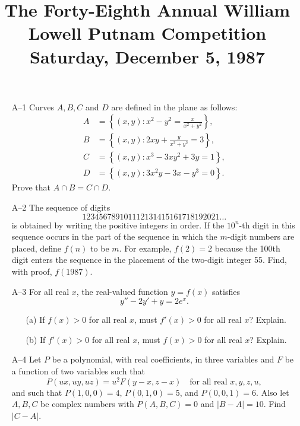 \documentclass[amssymb,twocolumn,pra,10pt,aps]{revtex4-1}
\begin{document}
\title{The Forty-Eighth Annual William Lowell Putnam Competition \\
    Saturday, December 5, 1987 \vspace{-2\baselineskip}}
\maketitle

\begin{itemize}
\item[A--1]
Curves $A,B,C$ and $D$ are defined in the plane as follows:
\begin{align*}
A &= \left\{ (x,y): x^2-y^2 = \frac{x}{x^2+y^2} \right\}, \\
B &= \left\{ (x,y): 2xy + \frac{y}{x^2+y^2} = 3 \right\}, \\
C &= \left\{ (x,y): x^3-3xy^2+3y=1 \right\}, \\
D &= \left\{ (x,y): 3x^2 y - 3x - y^3 = 0\right\}.
\end{align*}
Prove that $A \cap B = C \cap D$.

\item[A--2]
The sequence of digits
\[
1 2 3 4 5 6 7 8 9 1 0 1 1 1 2 1 3 1 4 1 5 1 6 1 7 1 8 1 9 2 0 2 1 \dots
\]
is obtained by writing the positive integers in order. If the
$10^n$-th digit in this sequence occurs in the part of the sequence in
which the $m$-digit numbers are placed, define $f(n)$ to be $m$. For
example, $f(2)=2$ because the 100th digit enters the sequence in the
placement of the two-digit integer 55. Find, with proof, $f(1987)$.

\item[A--3]
For all real $x$, the real-valued function $y=f(x)$ satisfies
\[
y''-2y'+y=2e^x.
\]
\begin{enumerate}
\item[(a)] If $f(x)>0$ for all real $x$, must $f'(x) > 0$ for all real
$x$? Explain.
\item[(b)] If $f'(x)>0$ for all real $x$, must $f(x) > 0$ for all real
$x$? Explain.
\end{enumerate}

\item[A--4]
Let $P$ be a polynomial, with real coefficients, in three variables
and $F$ be a function of two variables such that
\[
P(ux, uy, uz) = u^2 F(y-x,z-x) \quad \mbox{for all real $x,y,z,u$},
\]
and such that $P(1,0,0)=4$, $P(0,1,0)=5$, and $P(0,0,1)=6$. Also let
$A,B,C$ be complex numbers with $P(A,B,C)=0$ and $|B-A|=10$. Find $|C-A|$.


\end{itemize}
\end{document}
